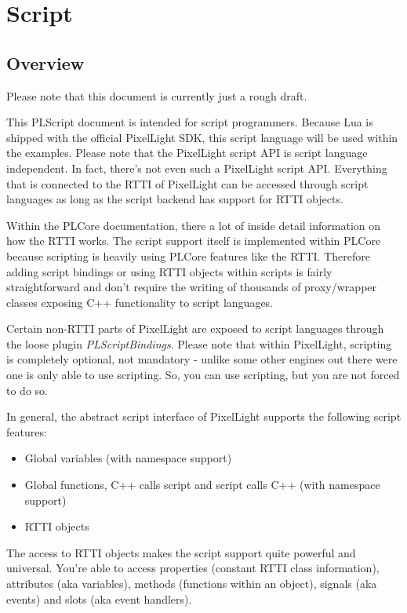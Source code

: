 \chapter{Script}




\section{Overview}
Please note that this document is currently just a rough draft.

This PLScript document is intended for script programmers. Because Lua is shipped with the official PixelLight SDK, this script language will be used within the examples. Please note that the PixelLight script API is script language independent. In fact, there's not even such a PixelLight script API. Everything that is connected to the RTTI of PixelLight can be accessed through script languages as long as the script backend has support for RTTI objects.

Within the PLCore documentation, there a lot of inside detail information on how the RTTI works. The script support itself is implemented within PLCore because scripting is heavily using PLCore features like the RTTI. Therefore adding script bindings or using RTTI objects within scripts is fairly straightforward and don't require the writing of thousands of proxy/wrapper classes exposing C++ functionality to script languages.

Certain non-RTTI parts of PixelLight are exposed to script languages through the loose plugin \emph{PLScriptBindings}. Please note that within PixelLight, scripting is completely optional, not mandatory - unlike some other engines out there were one is only able to use scripting. So, you can use scripting, but you are not forced to do so.

In general, the abstract script interface of PixelLight supports the following script features:
\begin{itemize}
\item{Global variables (with namespace support)}
\item{Global functions, C++ calls script and script calls C++ (with namespace support)}
\item{RTTI objects}
\end{itemize}

The access to RTTI objects makes the script support quite powerful and universal. You're able to access properties (constant RTTI class information), attributes (aka variables), methods (functions within an object), signals (aka events) and slots (aka event handlers).

